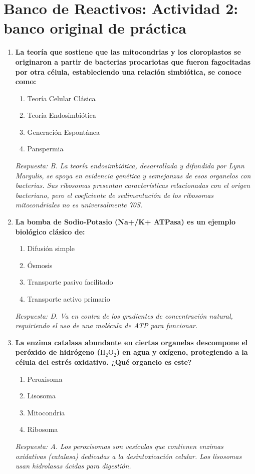 \section{Banco de Reactivos: Actividad 2: banco original de práctica}
\begin{enumerate}[label=\textbf{\arabic*.}]
    \item \textbf{La teoría que sostiene que las mitocondrias y los cloroplastos se originaron a partir de bacterias procariotas que fueron fagocitadas por otra célula, estableciendo una relación simbiótica, se conoce como:}
    \begin{enumerate}
        \item[A)] Teoría Celular Clásica
        \item[B)] Teoría Endosimbiótica
        \item[C)] Generación Espontánea
        \item[D)] Panspermia
    \end{enumerate}
    \textit{Respuesta: B. La teoría endosimbiótica, desarrollada y difundida por Lynn Margulis, se apoya en evidencia genética y semejanzas de esos organelos con bacterias. Sus ribosomas presentan características relacionadas con el origen bacteriano, pero el coeficiente de sedimentación de los ribosomas mitocondriales no es universalmente 70S.}

    \item \textbf{La bomba de Sodio-Potasio (Na+/K+ ATPasa) es un ejemplo biológico clásico de:}
    \begin{enumerate}
        \item[A)] Difusión simple
        \item[B)] Ósmosis
        \item[C)] Transporte pasivo facilitado
        \item[D)] Transporte activo primario
    \end{enumerate}
    \textit{Respuesta: D. Va en contra de los gradientes de concentración natural, requiriendo el uso de una molécula de ATP para funcionar.}

    \item \textbf{La enzima catalasa abundante en ciertas organelas descompone el peróxido de hidrógeno ($\mathrm{H}_{2}\mathrm{O}_{2}$) en agua y oxígeno, protegiendo a la célula del estrés oxidativo. ¿Qué organelo es este?}
    \begin{enumerate}
        \item[A)] Peroxisoma
        \item[B)] Lisosoma
        \item[C)] Mitocondria
        \item[D)] Ribosoma
    \end{enumerate}
    \textit{Respuesta: A. Los peroxisomas son vesículas que contienen enzimas oxidativas (catalasa) dedicadas a la desintoxicación celular. Los lisosomas usan hidrolasas ácidas para digestión.}


\end{enumerate}

